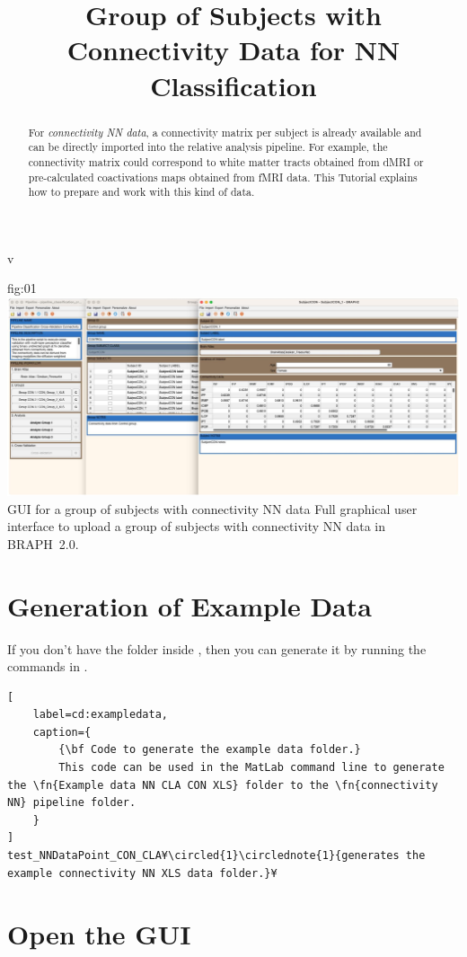v\documentclass[justified]{tufte-handout}
\title{Group of Subjects with Connectivity Data for NN Classification}
\begin{document}
\maketitle

\begin{abstract}
\noindent
For \emph{connectivity NN data}, a connectivity matrix per subject is already available and can be directly imported into the relative analysis pipeline. For example, the connectivity matrix could correspond to white matter tracts obtained from dMRI or pre-calculated coactivations maps obtained from fMRI data.
This Tutorial explains how to prepare and work with this kind of data.
\end{abstract}

\tableofcontents

	{fig:01}
	{\includegraphics{fig01.jpg}}
	{GUI for a group of subjects with connectivity NN data}
	{
	Full graphical user interface to upload a group of subjects with connectivity NN data in BRAPH~2.0. 
	}

\clearpage
\section{Generation of Example Data}

If you don't have the  folder inside , then you can generate it by running the commands in .
%
\begin{lstlisting}[
	label=cd:exampledata,
	caption={
		{\bf Code to generate the example data folder.}
		This code can be used in the MatLab command line to generate the \fn{Example data NN CLA CON XLS} folder to the \fn{connectivity NN} pipeline folder.
	}
]
test_NNDataPoint_CON_CLA¥\circled{1}\circlednote{1}{generates the example connectivity NN XLS data folder.}¥
\end{lstlisting}

\section{Open the GUI}
\end{document}
